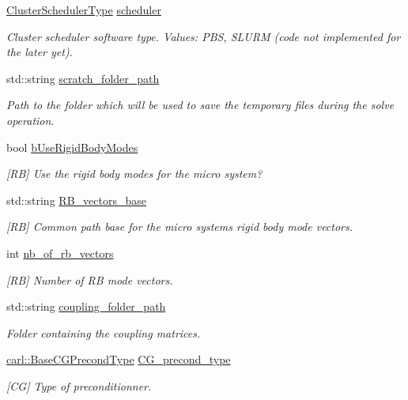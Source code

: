\begin{DoxyCompactItemize}
\item 
\hyperlink{namespacecarl_a67066fdf35a0c326f5147098c0cf45d1}{Cluster\+Scheduler\+Type} \hyperlink{structcarl_1_1feti__setup__finish__params_a30e2fbb1ab52dbbce37968be8e6f95b1}{scheduler}
\begin{DoxyCompactList}\small\item\em Cluster scheduler software type. {\itshape Values}\+: P\+B\+S, S\+L\+U\+R\+M (code not implemented for the later yet). \end{DoxyCompactList}\item 
std\+::string \hyperlink{structcarl_1_1feti__setup__finish__params_ac8490d7133284997e9497f13c75ed1bd}{scratch\+\_\+folder\+\_\+path}
\begin{DoxyCompactList}\small\item\em Path to the folder which will be used to save the temporary files during the solve operation. \end{DoxyCompactList}\item 
bool \hyperlink{structcarl_1_1feti__setup__finish__params_a4226249254863225438b36c9c2f47615}{b\+Use\+Rigid\+Body\+Modes}
\begin{DoxyCompactList}\small\item\em \mbox{[}R\+B\mbox{]} Use the rigid body modes for the micro system? \end{DoxyCompactList}\item 
std\+::string \hyperlink{structcarl_1_1feti__setup__finish__params_aebec4649657ad7602a20111ffdb01e06}{R\+B\+\_\+vectors\+\_\+base}
\begin{DoxyCompactList}\small\item\em \mbox{[}R\+B\mbox{]} Common path base for the micro system\textquotesingle{}s rigid body mode vectors. \end{DoxyCompactList}\item 
int \hyperlink{structcarl_1_1feti__setup__finish__params_a3fea6d0b9c2825b61e90714790c716de}{nb\+\_\+of\+\_\+rb\+\_\+vectors}
\begin{DoxyCompactList}\small\item\em \mbox{[}R\+B\mbox{]} Number of R\+B mode vectors. \end{DoxyCompactList}\item 
std\+::string \hyperlink{structcarl_1_1feti__setup__finish__params_aebb6a453ba760ab225a75d6b4e96fa75}{coupling\+\_\+folder\+\_\+path}
\begin{DoxyCompactList}\small\item\em Folder containing the coupling matrices. \end{DoxyCompactList}\item 
\hyperlink{namespacecarl_ad52f21755b51ffa926038b59ae194ea8}{carl\+::\+Base\+C\+G\+Precond\+Type} \hyperlink{structcarl_1_1feti__setup__finish__params_ad5b14913a3808cee9a058d7a90c4ee5e}{C\+G\+\_\+precond\+\_\+type}
\begin{DoxyCompactList}\small\item\em \mbox{[}C\+G\mbox{]} Type of preconditionner. \end{DoxyCompactList}\end{DoxyCompactItemize}


